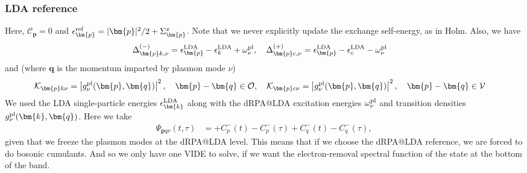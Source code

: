 \begin{frame}
    \frametitle{LDA reference}
Here, $\mathcal{C}_{\bm{p}}=0$ and $\epsilon_{\bm{p}}^{\rm ref}=|\bm{p}|^2/2 + \Sigma_{\bm{p}}^x$. \pause Note that we never explicitly update the exchange self-energy, as in Holm. \pause Also, we have
\begin{align}
\Delta_{\bm{p}k,\nu}^{(-)}
&=
\epsilon_{\bm{p}}^{\rm LDA}
-\epsilon_k^{\rm LDA}
+
\omega_{\nu}^{\rm pl}
, \quad
\Delta_{\bm{p}c,\nu}^{(+)}
=
\epsilon_{\bm{p}}^{\rm LDA}
-\epsilon_c^{\rm LDA}
-
\omega_{\nu}^{\rm pl}
\end{align}\pause
and (where $\bm{q}$ is the momentum imparted by plasmon mode $\nu$)
\begin{align}
\mathcal{K}_{\bm{p}k\nu}
&=
\left|g_\nu^{\rm pl}(\bm{p},\bm{q})\right|^2, \quad \bm{p}-\bm{q}\in\mathcal{O}
,\quad 
\mathcal{K}_{\bm{p}c\nu}
=
\left|g_\nu^{\rm pl}(\bm{p},\bm{q})\right|^2, \quad \bm{p}-\bm{q}\in\mathcal{V}
\end{align} \pause
We used the LDA single-particle energies $\epsilon_{\bm{k}}^{\rm LDA}$ along with the dRPA@LDA excitation energies $\omega_{\nu}^{\rm pl}$ and transition densities $g_\nu^{\rm pl}(\bm{k},\bm{q})$. \pause
Here we take 
\begin{align}
\Psi_{\bm{p}q\nu}(t,\tau)
&=
+C_p^{-}(t)
-C_p^{-}(\tau)
+C_q^{-}(t)
-C_q^{-}(\tau),
\end{align}
given that we freeze the plasmon modes at the dRPA@LDA level. \pause This means that if we choose the dRPA@LDA reference, we are forced to do bosonic cumulants. And so we only have one VIDE to solve, if we want the electron-removal spectral function of the state at the bottom of the band.
\end{frame}
